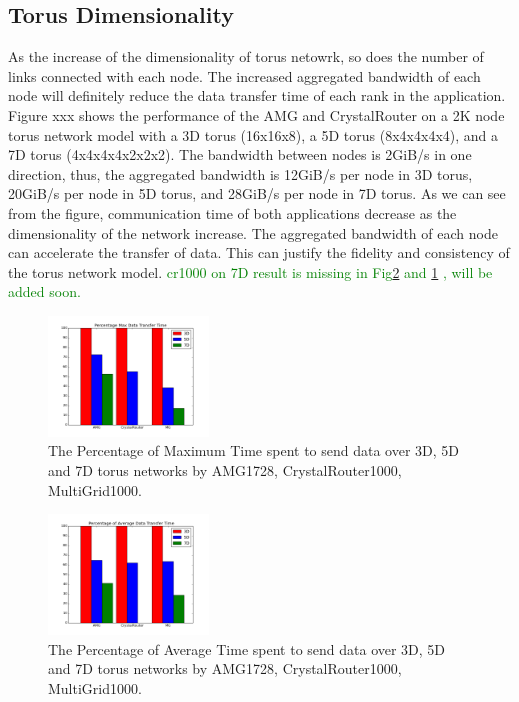 \documentclass[conference]{IEEEtran}
\begin{document}
\subsection{Torus Dimensionality}
\label{sec: dimensionality study}

As the increase of the dimensionality of torus netowrk, so does the number of links connected with each node. The increased aggregated bandwidth of each node will definitely reduce the data transfer time of each rank in the application. Figure xxx shows the performance of the AMG and CrystalRouter on a 2K node torus network model with a 3D torus (16x16x8), a 5D torus (8x4x4x4x4), and a 7D torus (4x4x4x4x2x2x2). The bandwidth between nodes is 2GiB/s in one direction, thus, the aggregated bandwidth is 12GiB/s per node in 3D torus, 20GiB/s per node in 5D torus, and 28GiB/s per node in 7D torus. As we can see from the figure, communication time of both applications decrease as the dimensionality of the network increase. The aggregated bandwidth of each node can accelerate the transfer of data. This can justify the fidelity and consistency of the torus network model.
\textcolor{green}{cr1000 on 7D result is missing in Fig\ref{fig: dimenstudy-avgtime} and \ref{fig: dimenstudy-maxtime} , will be added soon.}

\begin{figure}[h!] 
  \centering
  \includegraphics[width=0.38\textwidth]{figs/dimenstudy/maxtime}
   \caption{The Percentage of Maximum Time spent to send data over 3D, 5D and 7D torus networks by AMG1728, CrystalRouter1000, MultiGrid1000.}
   \label{fig: dimenstudy-maxtime}
\end{figure}

\begin{figure}[h!] 
  \centering
  \includegraphics[width=0.38\textwidth]{figs/dimenstudy/avgtime}
   \caption{The Percentage of Average Time spent to send data over 3D, 5D and 7D torus networks by AMG1728, CrystalRouter1000, MultiGrid1000.}
   \label{fig: dimenstudy-avgtime}
\end{figure}
\end{document}
